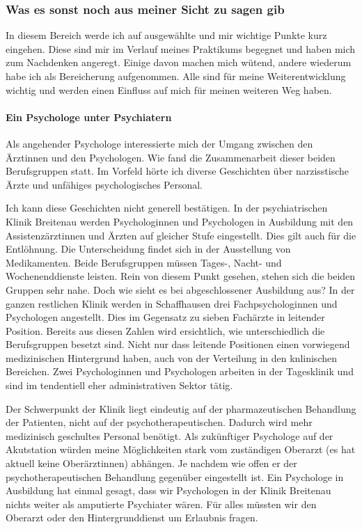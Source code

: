 \documentclass[jou,apacite]{apa6}
\begin{document}
\subsubsection{Was es sonst noch aus meiner Sicht zu sagen gib} \label{sec:Sonstiges}
In diesem Bereich werde ich auf ausgewählte und mir wichtige Punkte kurz eingehen. Diese sind mir im Verlauf meines Praktikums begegnet und haben mich zum Nachdenken angeregt. Einige davon machen mich wütend, andere wiederum habe ich als Bereicherung aufgenommen. Alle sind für meine Weiterentwicklung wichtig und werden einen Einfluss auf mich für meinen weiteren Weg haben.

\paragraph{Ein Psychologe unter Psychiatern}
Als angehender Psychologe interessierte mich der Umgang zwischen den Ärztinnen und den Psychologen. Wie fand die Zusammenarbeit dieser beiden Berufsgruppen statt. Im Vorfeld hörte ich diverse Geschichten über narzisstische Ärzte und unfähiges psychologisches Personal. 

Ich kann diese Geschichten nicht generell bestätigen. In der psychiatrischen Klinik Breitenau werden Psychologinnen und Psychologen in Ausbildung mit den Assistenzärztinnen und Ärzten auf gleicher Stufe eingestellt. Dies gilt auch für die Entlöhnung. Die Unterscheidung findet sich in der Ausstellung von Medikamenten. Beide Berufsgruppen müssen Tages-, Nacht- und Wochenenddienste leisten. Rein von diesem Punkt gesehen, stehen sich die beiden Gruppen sehr nahe. Doch wie sieht es bei abgeschlossener Ausbildung aus? In der ganzen restlichen Klinik werden in Schaffhausen drei Fachpsychologinnen und Psychologen angestellt. Dies im Gegensatz zu sieben Fachärzte in leitender Position. Bereits aus diesen Zahlen wird ersichtlich, wie unterschiedlich die Berufsgruppen besetzt sind. Nicht nur dass leitende Positionen einen vorwiegend medizinischen Hintergrund haben, auch von der Verteilung in den knlinischen Bereichen. Zwei Psychologinnen und Psychologen arbeiten in der Tagesklinik und sind im tendentiell eher administrativen Sektor tätig. 

Der Schwerpunkt der Klinik liegt eindeutig auf der pharmazeutischen Behandlung der Patienten, nicht auf der psychotherapeutischen. Dadurch wird mehr medizinisch geschultes Personal benötigt. Als zukünftiger Psychologe auf der Akutstation würden meine Möglichkeiten stark vom zuständigen Oberarzt (es hat aktuell keine Oberärztinnen) abhängen. Je nachdem wie offen er der psychotherapeutischen Behandlung gegenüber eingestellt ist. Ein Psychologe in Ausbildung hat einmal gesagt, dass wir Psychologen in der Klinik Breitenau nichts weiter als amputierte Psychiater wären. Für alles müssten wir den Oberarzt oder den Hintergrunddienst um Erlaubnis fragen. 
\end{document}
